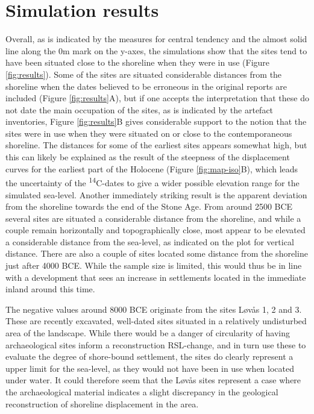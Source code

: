 \documentclass[
]{article}
\begin{document}
\hypertarget{simulation-results}{%
\section{Simulation results}\label{simulation-results}}

Overall, as is indicated by the measures for central tendency and the almost solid line along the 0m mark on the y-axes, the simulations show that the sites tend to have been situated close to the shoreline when they were in use (Figure \ref{fig:results}). Some of the sites are situated considerable distances from the shoreline when the dates believed to be erroneous in the original reports are included (Figure \ref{fig:results}A), but if one accepts the interpretation that these do not date the main occupation of the sites, as is indicated by the artefact inventories, Figure \ref{fig:results}B gives considerable support to the notion that the sites were in use when they were situated on or close to the contemporaneous shoreline. The distances for some of the earliest sites appears somewhat high, but this can likely be explained as the result of the steepness of the displacement curves for the earliest part of the Holocene (Figure \ref{fig:map-iso}B), which leads the uncertainty of the \textsuperscript{14}C-dates to give a wider possible elevation range for the simulated sea-level. Another immediately striking result is the apparent deviation from the shoreline towards the end of the Stone Age. From around 2500 BCE several sites are situated a considerable distance from the shoreline, and while a couple remain horizontally and topographically close, most appear to be elevated a considerable distance from the sea-level, as indicated on the plot for vertical distance. There are also a couple of sites located some distance from the shoreline just after 4000 BCE. While the sample size is limited, this would thus be in line with a development that sees an increase in settlements located in the immediate inland around this time.

The negative values around 8000 BCE originate from the sites Løvås 1, 2 and 3. These are recently excavated, well-dated sites situated in a relatively undisturbed area of the landscape. While there would be a danger of circularity of having archaeological sites inform a reconstruction RSL-change, and in turn use these to evaluate the degree of shore-bound settlement, the sites do clearly represent a upper limit for the sea-level, as they would not have been in use when located under water. It could therefore seem that the Løvås sites represent a case where the archaeological material indicates a slight discrepancy in the geological reconstruction of shoreline displacement in the area.
\end{document}
